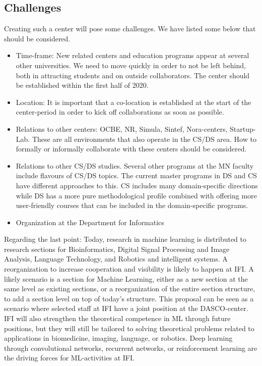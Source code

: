 \documentclass[a4paper,10pt]{article}
\begin{document}
\subsection{Challenges}
Creating such a center will pose some challenges. We have listed some below that should be considered. 
\begin{itemize}
\item Time-frame: New related centers and education programs appear at several other universities. We need to move quickly in order to not be left behind, both in attracting students and on outside collaborators. The center should be established within the first half of 2020.
\item Location: It is important that a co-location is established at the start of the center-period in order to kick off collaborations as soon as possible. 

\item Relations to other centers: OCBE, NR, Simula, Sintef, Nora-centers, Startup-Lab. These are all environments that also operate in the CS/DS area. How to formally or informally collaborate with these centers should be considered.
\item Relations to other CS/DS studies. Several other programs at the MN faculty include flavours of CS/DS topics. The current master programs in DS and CS have different approaches to this. CS includes many domain-specific directions while DS has a more pure methodological profile combined with offering more user-friendly courses that can be included in the domain-specific programs.   
\item Organization at the Department for Informatics 
\end{itemize}
 Regarding the last point: Today, research in machine learning is distributed to research sections for Bioinformatics,   Digital Signal Processing and Image Analysis, Language Technology, and Robotics and intelligent systems. A reorganization to increase cooperation and visibility  is likely to happen at IFI. A likely scenario is a section for Machine Learning, either as a new section at the same level as existing sections, or a reorganization of the entire section structure, to add a section level on top of today's structure. This proposal can be seen as a scenario where selected staff at IFI have a joint position at the DASCO-center. IFI will also strengthen the theoretical competence in ML through future positions, but they will still be tailored to solving theoretical problems related to applications in biomedicine, imaging, language, or robotics. Deep learning through convolutional networks,  recurrent networks, or reinforcement learning are the driving forces for ML-activities at IFI.  
\end{document}
